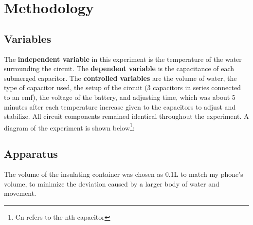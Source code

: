 \documentclass[12pt]{article}
\numberwithin{equation}{section}
\begin{document}
\section{Methodology}
\subsection{Variables}
The \textbf{independent variable} in this experiment is the temperature of the water surrounding the circuit. The \textbf{dependent variable} is the capacitance of each submerged capacitor. The \textbf{controlled variables} are the volume of water, the type of capacitor used, the setup of the circuit (3 capacitors in series connected to an emf), the voltage of the battery, and adjusting time, which was about 5 minutes after each temperature increase given to the capacitors to adjust and stabilize. All circuit components remained identical throughout the experiment. A diagram of the experiment is shown below\footnote{Cn refers to the nth capacitor}:



\subsection{Apparatus}
The volume of the insulating container was chosen as 0.1L to match my phone's volume, to minimize the deviation caused by a larger body of water and movement. 
\end{document}
